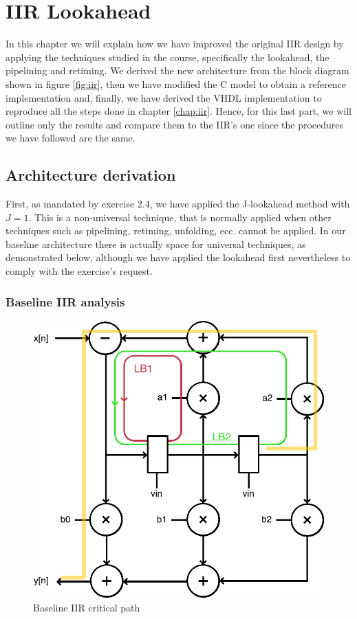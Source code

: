 \chapter{IIR Lookahead}
\label{chap:iir_lookahead}

In this chapter we will explain how we have improved the original IIR design by applying the techniques studied in the course,
specifically the lookahead, the pipelining and retiming. We derived the new architecture from the block diagram shown in
figure \ref{fig:iir}, then we have modified the C model to obtain a reference implementation and, finally, we have derived
the VHDL implementation to reproduce all the steps done in chapter \ref{chap:iir}. Hence, for this last part, we will
outline only the results and compare them to the IIR's one since the procedures we have followed are the same.

\section{Architecture derivation}

First, as mandated by exercise 2.4, we have applied the J-lookahead method with $J = 1$. This is a non-universal technique,
that is normally applied when other techniques such as pipelining, retiming, unfolding, ecc. cannot be applied. In our baseline
architecture there is actually space for universal techniques, as demonstrated below, although we have applied the lookahead
first nevertheless to comply with the exercise's request.

\subsection{Baseline IIR analysis}

\begin{figure}[!ht]
	\centering
	\includegraphics[width=0.4\linewidth]{./chapters/pictures/loop_bound_iir.pdf}
	\caption{Baseline IIR critical path}
	\label{fig:loop_bound_iir}
\end{figure}

